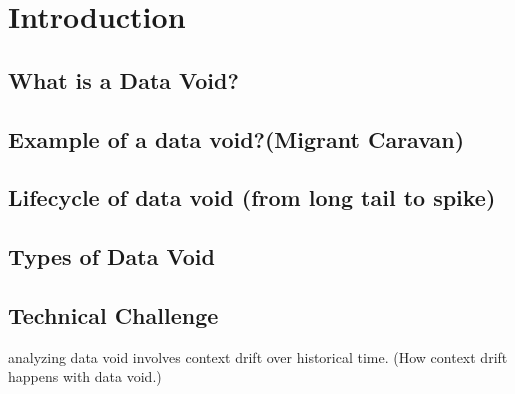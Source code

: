 
\section{Introduction} \label{sec:introduction}
\subsection{What is a Data Void?}
\subsection{Example of a data void?(Migrant Caravan)}
\subsection{Lifecycle of data void (from long tail to spike)}
\subsection{Types of Data Void}
\subsection{Technical Challenge}
analyzing data void involves context drift over historical time. (How context drift happens with data void.)
